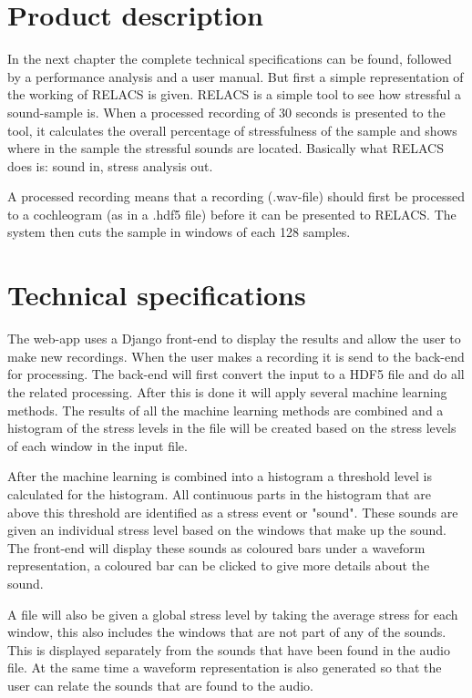\documentclass[a4paper]{article}
\begin{document}
\section{Product description}
In the next chapter the complete technical specifications can be found, followed by a performance analysis and a user manual. 
But first a simple representation of the working of RELACS is given. RELACS is a simple tool to see how stressful a sound-sample is. 
When a processed recording of 30 seconds is presented to the tool, it calculates the overall percentage of stressfulness of the sample and shows where in the sample the stressful sounds are located. 
Basically what RELACS does is: sound in, stress analysis out.

A processed recording means that a recording (.wav-file) should first be processed to a cochleogram (as in a .hdf5 file) before it can be presented to RELACS. The system then cuts the sample in windows of each 128 samples.

\section{Technical specifications}
The web-app uses a Django front-end to display the results and allow the user
to make new recordings. When the user makes a recording it is send to the
back-end for processing. The back-end will first convert the input to a HDF5
file and do all the related processing. After this is done it will apply several
machine learning methods. The results of all the machine learning methods are
combined and a histogram of the stress levels in the file will be created based
on the stress levels of each window in the input file.

After the machine learning is combined into a histogram a threshold level is
calculated for the histogram. All continuous parts in the histogram that are
above this threshold are identified as a stress event or "sound". These sounds
are given an individual stress level based on the windows that make up the
sound. The front-end will display these sounds as coloured bars under a waveform
representation, a coloured bar can be clicked to give more details about the
sound.

A file will also be given a global stress level by taking the average stress
for each window, this also includes the windows that are not part of any of the
sounds. This is displayed separately from the sounds that have been found in
the audio file. At the same time a waveform representation is also generated so
that the user can relate the sounds that are found to the audio.
\end{document}
